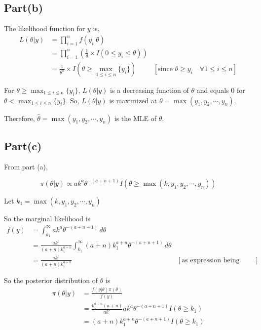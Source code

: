 \documentclass[a4paper]{article}
\begin{document}
\subsection*{Part(b)}
The likelihood function for $y$ is,
\begin{align*}
    L(\theta|y) &= \prod_{i=1}^{n} f(y_i|\theta)\\
    &= \prod_{i=1}^{n} \left(\frac{1}{\theta} \times I(0 \leq y_i \leq \theta)\right)\\
    &= \frac{1}{\theta^n} \times I(\theta \geq \max_{1\leq i \leq n} \{y_i\}) & [\text{since \(\theta \geq y_i \quad \forall 1\leq i \leq n\)}]
\end{align*}

For \(\theta \geq \max_{1\leq i \leq n} \{y_i\}\), \(L(\theta|y)\) is a decreasing function of \(\theta\) and equals 0 for \(\theta < \max_{1\leq i \leq n} \{y_i\}\).
So, \(L(\theta|y)\) is maximized at \(\theta = \max (y_1, y_2, \cdots, y_n)\).
\vspace{0.25cm}

\noindent Therefore, \(\hat{\theta} =  \max (y_1, y_2, \cdots, y_n)\) is the MLE of \(\theta\).

\subsection*{Part(c)}

From part (a),

\[
\pi(\theta|y)  \propto a k^{a} \theta^{-(a+n+1)} I(\theta \geq \max(k,y_1,y_2,\cdots,y_n))
\]

Let \(k_1 = \max(k,y_1,y_2,\cdots,y_n)\)

\vspace{0.25cm}
So the marginal likelihood is 
\begin{align*}
    f(y) &= \int_{k_1}^{\infty} a k^{a} \theta^{-(a+n+1)} \,d\theta\\
        &= \frac{ak^{a}}{(a+n)k_1^{a+n}}\int_{k_1}^{\infty} (a+n) k_1^{a+n} \theta^{-(a+n+1)} \,d\theta\\
        &= \frac{ak^a}{(a+n)k_1^{a+n}} & \left[\text{as expression being integrated is pdf of Pareto distribution}\right]
\end{align*}

So the posterior distribution of \(\theta\) is 
\begin{align*}
    \pi(\theta|y) &= \frac{f(y|\theta)\pi(\theta)}{f(y)}\\ 
    &= \frac{k_1^{a+n}(a+n)}{ak^a} ak^a\theta^{-(a+n+1)} I(\theta \geq k_1)\\
    &= (a+n) k_1^{a+n} \theta^{-(a+n+1)} I(\theta \geq k_1)\\
\end{align*}
\end{document}
